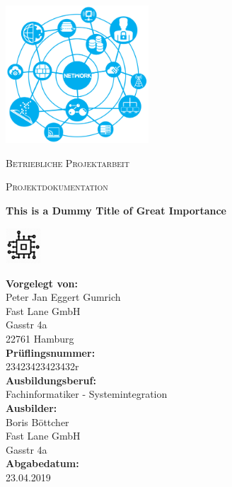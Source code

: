 \documentclass[11pt]{article} %
\newcommand{\InsertTitle}{This is a Dummy Title of Great Importance}
\newcommand{\spacing}{\vspace{0.4cm}}
\begin{document}
\begin{titlepage}
	\thispagestyle{empty}
	\centering
	\includegraphics[width=0.4\textwidth]{title.png}\par\vspace{1cm}
	{\scshape Betriebliche Projektarbeit  \\}
	{\scshape Projektdokumentation  \par}
	\begin{changemargin}{0cm}{0cm}
	\centering
	{\huge\bfseries \InsertTitle \par}
	\end{changemargin} 
	\includegraphics[width=0.1\textwidth]{icon.png}
	\vspace{0.5cm}
	 \vfill
	\begin{changemargin}{0cm}{0cm}
	\raggedright
	{\bfseries Vorgelegt von:\\}
	Peter Jan Eggert Gumrich\\
	Fast Lane GmbH \\
	Gasstr 4a \\
	22761 Hamburg \\ 
	\spacing
	{\bfseries Prüflingsnummer:\\}
	23423423423432r\\	
	\spacing	
	{\bfseries Ausbildungsberuf:\\}
	Fachinformatiker - Systemintegration\\
	\spacing
	{\bfseries Ausbilder:\\}
	Boris Böttcher\\
	Fast Lane  GmbH \\
	Gasstr 4a\\
	\spacing
	{\bfseries Abgabedatum:\\}
	23.04.2019\\
	\end{changemargin} 
	\vfill
\end{titlepage}
\end{document}
